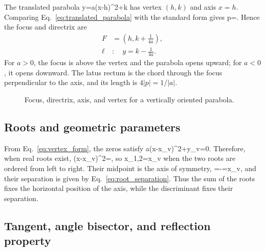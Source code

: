 The translated parabola
\be
 y=a(x-h)^2+k
\ee
has vertex $(h,k)$ and axis $x=h$. Comparing Eq.~\eqref{eq:translated_parabola} with the standard form gives
\be
p=.
\ee
Hence the focus and directrix are
\bse
\begin{align}
F&=\left(h,k+\frac{1}{4a}\right),\\
\ell&:\quad y=k-\frac{1}{4a}.
\end{align}
\ese
For $a>0$, the focus is above the vertex and the parabola opens upward; for $a<0$, it opens downward. The latus rectum is the chord through the focus perpendicular to the axis, and its length is $4|p|=1/|a|$.

\begin{figure}[htbp]
\centering
{}
\caption{Focus, directrix, axis, and vertex for a vertically oriented parabola.}
\end{figure}

\subsection{Roots and geometric parameters}

From Eq.~\eqref{eq:vertex_form}, the zeros satisfy
\be
 a(x-x_v)^2+y_v=0.
\ee
Therefore, when real roots exist,
\be
(x-x_v)^2=,
\ee
so
\be
x_{1,2}=x_v\pm{}
\ee
when the two roots are ordered from left to right. Their midpoint is the axis of symmetry,
\be
{}=-=x_v,
\ee
and their separation is given by Eq.~\eqref{eq:root_separation}. Thus the sum of the roots fixes the horizontal position of the axis, while the discriminant fixes their separation.

\subsection{Tangent, angle bisector, and reflection property}

